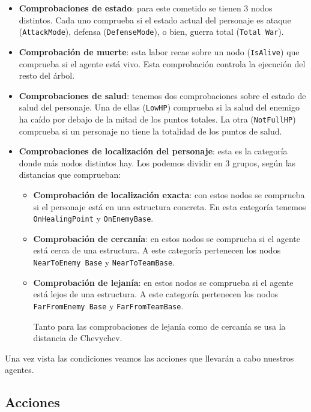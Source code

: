 \begin{itemize}
    \item \textbf{Comprobaciones de estado}: para este cometido se tienen 3 nodos distintos. Cada uno comprueba si el estado actual del personaje es ataque (\texttt{AttackMode}), defensa (\texttt{DefenseMode}), o bien, guerra total (\texttt{Total War}).
    \item \textbf{Comprobación de muerte}: esta labor recae sobre un nodo (\texttt{IsAlive}) que comprueba si el agente está vivo. Esta comprobación controla la ejecución del resto del árbol.
    \item \textbf{Comprobaciones de salud}: tenemos dos comprobaciones sobre el estado de salud del personaje. Una de ellas (\texttt{LowHP}) comprueba si la salud del enemigo ha caído por debajo de la mitad de los puntos totales. La otra (\texttt{NotFullHP}) comprueba si un personaje no tiene la totalidad de los puntos de salud.
    \item \textbf{Comprobaciones de localización del personaje}: esta es la categoría donde más nodos distintos hay. Los podemos dividir en 3 grupos, según las distancias que comprueban:
        \begin{itemize}
            \item \textbf{Comprobación de localización exacta}: con estos nodos se comprueba si el personaje está en una estructura concreta. En esta categoría tenemos \texttt{OnHealingPoint} y \texttt{OnEnemyBase}. 
            \item \textbf{Comprobación de cercanía}: en estos nodos se comprueba si el agente está cerca de una estructura. A este categoría pertenecen los nodos \texttt{NearToEnemy Base} y \texttt{NearToTeamBase}.
            \item \textbf{Comprobación de lejanía}: en estos nodos se comprueba si el agente está lejos de una estructura. A este categoría pertenecen los nodos \texttt{FarFromEnemy Base} y \texttt{FarFromTeamBase}.
            
            Tanto para las comprobaciones de lejanía como de cercanía se usa la distancia de Chevychev. 
        \end{itemize}
\end{itemize}

Una vez vista las condiciones veamos las acciones que llevarán a cabo nuestros agentes.

\subsection{Acciones}


